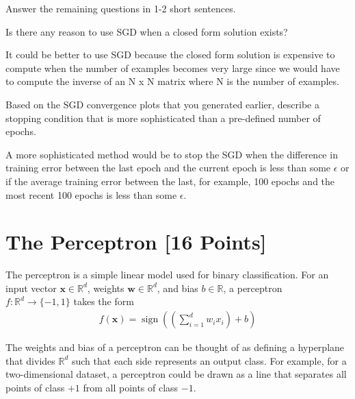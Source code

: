 Answer the remaining questions in 1-2 short sentences.

\begin{problem}[2]
  Is there any reason to use SGD when a closed form solution exists?
\end{problem}
\begin{solution}
  It could be better to use SGD because the closed form solution is expensive to compute when the number of examples becomes very large since we would have to compute the inverse of an N x N matrix where N is the number of examples.
\end{solution}

\begin{problem}[2]
  Based on the SGD convergence plots that you generated earlier, describe a stopping condition that is more sophisticated than a pre-defined number of epochs.
\end{problem}
\begin{solution}
  A more sophisticated method would be to stop the SGD when the difference in training error between the last epoch and the current epoch is less than some $\epsilon$ or if the average training error between the last, for example, 100 epochs and the most recent 100 epochs is less than some $\epsilon$. 
\end{solution}



\newpage
\section{The Perceptron [16 Points]}

The perceptron is a simple linear model used for binary classification. For an input vector $\mathbf{x} \in \mathbb{R}^d$, weights $\mathbf{w} \in \mathbb{R}^d$, and bias $b \in \mathbb{R}$, a perceptron $f: \mathbb{R}^d \rightarrow \{-1,1\}$ takes the form
\begin{align*}
  f(\mathbf{x}) = \operatorname{sign}\left(\left(\sum_{i=1}^d w_i x_i\right) + b \right)
\end{align*}

The weights and bias of a perceptron can be thought of as defining a hyperplane that divides $\mathbb{R}^d$ such that each side represents an output class. For example, for a two-dimensional dataset, a perceptron could be drawn as a line that separates all points of class $+1$ from all points of class $-1$.

